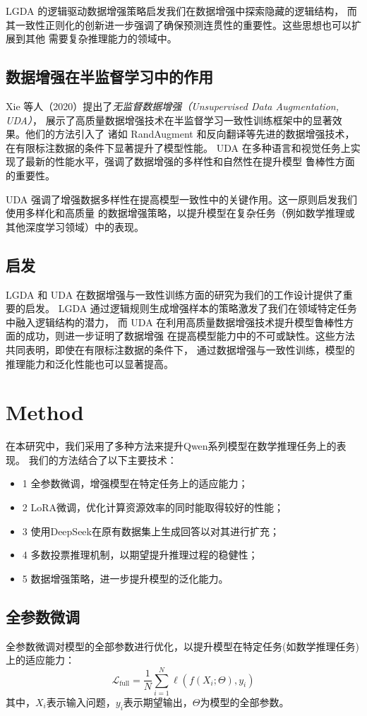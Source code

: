 \documentclass{article}
\begin{document}
LGDA 的逻辑驱动数据增强策略启发我们在数据增强中探索隐藏的逻辑结构，
而其一致性正则化的创新进一步强调了确保预测连贯性的重要性。这些思想也可以扩展到其他
需要复杂推理能力的领域中。

\subsection{数据增强在半监督学习中的作用}
Xie 等人（2020）提出了\textit{无监督数据增强（Unsupervised Data Augmentation, UDA）}，
展示了高质量数据增强技术在半监督学习一致性训练框架中的显著效果。他们的方法引入了
诸如 RandAugment 和反向翻译等先进的数据增强技术，在有限标注数据的条件下显著提升了模型性能。
UDA 在多种语言和视觉任务上实现了最新的性能水平，强调了数据增强的多样性和自然性在提升模型
鲁棒性方面的重要性。

UDA 强调了增强数据多样性在提高模型一致性中的关键作用。这一原则启发我们使用多样化和高质量
的数据增强策略，以提升模型在复杂任务（例如数学推理或其他深度学习领域）中的表现。

\subsection{启发}
LGDA 和 UDA 在数据增强与一致性训练方面的研究为我们的工作设计提供了重要的启发。
LGDA 通过逻辑规则生成增强样本的策略激发了我们在领域特定任务中融入逻辑结构的潜力，
而 UDA 在利用高质量数据增强技术提升模型鲁棒性方面的成功，则进一步证明了数据增强
在提高模型能力中的不可或缺性。这些方法共同表明，即使在有限标注数据的条件下，
通过数据增强与一致性训练，模型的推理能力和泛化性能也可以显著提高。



\section{Method}


\par 在本研究中，我们采用了多种方法来提升Qwen系列模型在数学推理任务上的表现。
我们的方法结合了以下主要技术：
\begin{itemize}
    \item1 全参数微调，增强模型在特定任务上的适应能力；
    \item2 LoRA微调，优化计算资源效率的同时能取得较好的性能；
    \item3 使用DeepSeek在原有数据集上生成回答以对其进行扩充；
    \item4 多数投票推理机制，以期望提升推理过程的稳健性；
    \item5 数据增强策略，进一步提升模型的泛化能力。
\end{itemize}
 
\subsection{全参数微调}
全参数微调对模型的全部参数进行优化，以提升模型在特定任务(如数学推理任务)上的适应能力：
$$
\mathcal{L}_{\text{full}} = \frac{1}{N} \sum_{i=1}^N \ell(f(X_i; \Theta), y_i)
$$
其中，$X_i$表示输入问题，$y_i$表示期望输出，$\Theta$为模型的全部参数。
\end{document}
